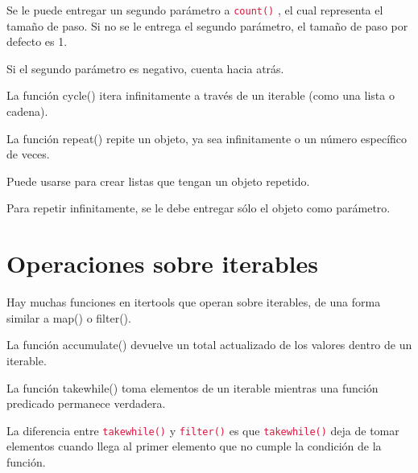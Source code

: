\documentclass{report}
\newcommand{\ttt}[1]{
  \textcolor{Crimson}{\texttt{#1}}
}
\begin{document}

Se le puede entregar un segundo parámetro a \ttt{count()}, el cual representa el tamaño de paso. Si no se le entrega el segundo parámetro, el tamaño de paso por defecto es 1.


Si el segundo parámetro es negativo, cuenta hacia atrás.


La función cycle() itera infinitamente a través de un iterable (como una lista o cadena).



La función repeat() repite un objeto, ya sea infinitamente o un número específico de veces.


Puede usarse para crear listas que tengan un objeto repetido.


Para repetir infinitamente, se le debe entregar sólo el objeto como parámetro.


\section{Operaciones sobre iterables}

Hay muchas funciones en itertools que operan sobre iterables, de una forma similar a map() o filter().\smallskip

La función accumulate() devuelve un total actualizado de los valores dentro de un iterable.


La función takewhile() toma elementos de un iterable mientras una función predicado permanece verdadera.


La diferencia entre \ttt{takewhile()} y \ttt{filter()} es que \ttt{takewhile()} deja de tomar elementos cuando llega al primer elemento que no cumple la condición de la función.

\end{document}
